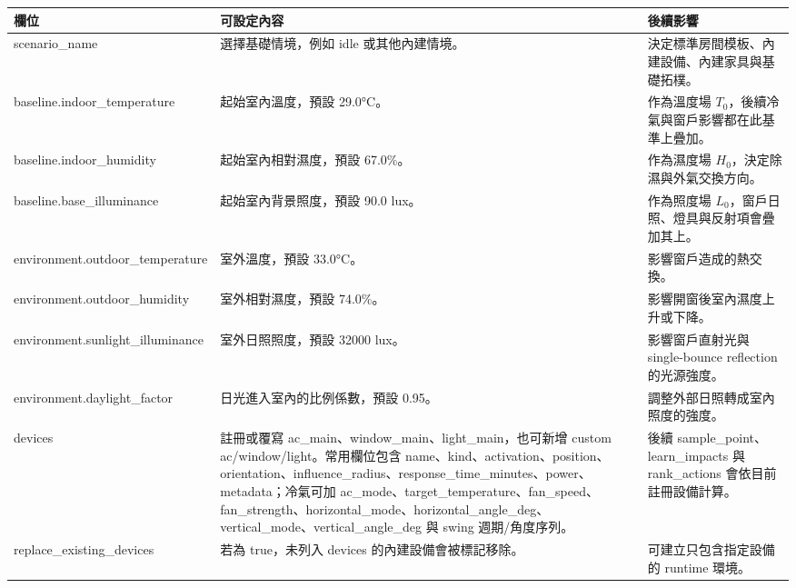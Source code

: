 \documentclass[12pt,a4paper]{article}
\begin{document}
\begin{table}[htbp]
\centering
\footnotesize
\renewcommand{\arraystretch}{1.25}
\begin{tabular}{|>{\raggedright\arraybackslash}p{}|>{\raggedright\arraybackslash}p{}|>{\raggedright\arraybackslash}p{}|}
\hline
\textbf{欄位} & \textbf{可設定內容} & \textbf{後續影響} \\
\hline
scenario\_\allowbreak{}name & 選擇基礎情境，例如 idle 或其他內建情境。 & 決定標準房間模板、內建設備、內建家具與基礎拓樸。 \\
\hline
baseline.indoor\_\allowbreak{}temperature & 起始室內溫度，預設 29.0°C。 & 作為溫度場 $T_0$，後續冷氣與窗戶影響都在此基準上疊加。 \\
\hline
baseline.indoor\_\allowbreak{}humidity & 起始室內相對濕度，預設 67.0\%。 & 作為濕度場 $H_0$，決定除濕與外氣交換方向。 \\
\hline
baseline.base\_\allowbreak{}illuminance & 起始室內背景照度，預設 90.0 lux。 & 作為照度場 $L_0$，窗戶日照、燈具與反射項會疊加其上。 \\
\hline
environment.outdoor\_\allowbreak{}temperature & 室外溫度，預設 33.0°C。 & 影響窗戶造成的熱交換。 \\
\hline
environment.outdoor\_\allowbreak{}humidity & 室外相對濕度，預設 74.0\%。 & 影響開窗後室內濕度上升或下降。 \\
\hline
environment.sunlight\_\allowbreak{}illuminance & 室外日照照度，預設 32000 lux。 & 影響窗戶直射光與 single-bounce reflection 的光源強度。 \\
\hline
environment.daylight\_\allowbreak{}factor & 日光進入室內的比例係數，預設 0.95。 & 調整外部日照轉成室內照度的強度。 \\
\hline
devices & 註冊或覆寫 ac\_\allowbreak{}main、window\_\allowbreak{}main、light\_\allowbreak{}main，也可新增 custom ac/window/light。常用欄位包含 name、kind、activation、position、orientation、influence\_\allowbreak{}radius、response\_\allowbreak{}time\_\allowbreak{}minutes、power、metadata；冷氣可加 ac\_\allowbreak{}mode、target\_\allowbreak{}temperature、fan\_\allowbreak{}speed、fan\_\allowbreak{}strength、horizontal\_\allowbreak{}mode、horizontal\_\allowbreak{}angle\_\allowbreak{}deg、vertical\_\allowbreak{}mode、vertical\_\allowbreak{}angle\_\allowbreak{}deg 與 swing 週期/角度序列。 & 後續 sample\_\allowbreak{}point、learn\_\allowbreak{}impacts 與 rank\_\allowbreak{}actions 會依目前註冊設備計算。 \\
\hline
replace\_\allowbreak{}existing\_\allowbreak{}devices & 若為 true，未列入 devices 的內建設備會被標記移除。 & 可建立只包含指定設備的 runtime 環境。 \\

\end{tabular}
\end{table}
\end{document}
